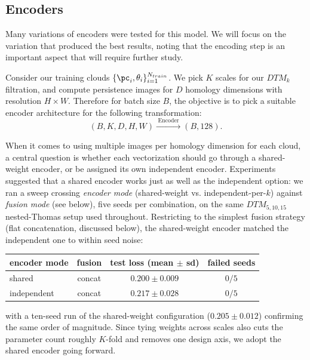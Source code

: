 \subsection{Encoders}
Many variations of encoders were tested for this model. We will focus on the variation that produced the best results, noting that the encoding step is an important aspect that will require further study.

Consider our training clouds $\{\pc_i, \theta_i\}_{i=1}^{N_{train}}$. We pick $K$ scales for our $DTM_k$ filtration, and compute persistence images for $D$ homology dimensions with resolution $H \times W$. Therefore for batch size $B$, the objective is to pick a suitable encoder architecture for the following transformation:
    \begin{equation}
    (B, K, D, H, W) \xrightarrow{\;\text{Encoder}\;} (B, 128).
    \end{equation}

When it comes to using multiple images per homology dimension for each cloud, a central question is whether each vectorization should go through a shared-weight encoder, or be assigned its own independent encoder. Experiments suggested that a shared encoder works just as well as the independent option: we ran a sweep crossing \emph{encoder mode} (shared-weight vs. independent-per-$k$) against \emph{fusion mode} (see below), five seeds per combination, on the same $DTM_{5,10,15}$ nested-Thomas setup used throughout. Restricting to the simplest fusion strategy (flat concatenation, discussed below), the shared-weight encoder matched the independent one to within seed noise:

\begin{center}
\begin{tabular}{lccc}
\toprule
encoder mode & fusion & test loss (mean $\pm$ sd) & failed seeds \\
\midrule
shared      & concat & $0.200 \pm 0.009$ & $0/5$ \\
independent & concat & $0.217 \pm 0.028$ & $0/5$ \\
\bottomrule
\end{tabular}
\end{center}

with a ten-seed run of the shared-weight configuration ($0.205 \pm 0.012$) confirming the same order of magnitude. Since tying weights across scales also cuts the parameter count roughly $K$-fold and removes one design axis, we adopt the shared encoder going forward.

